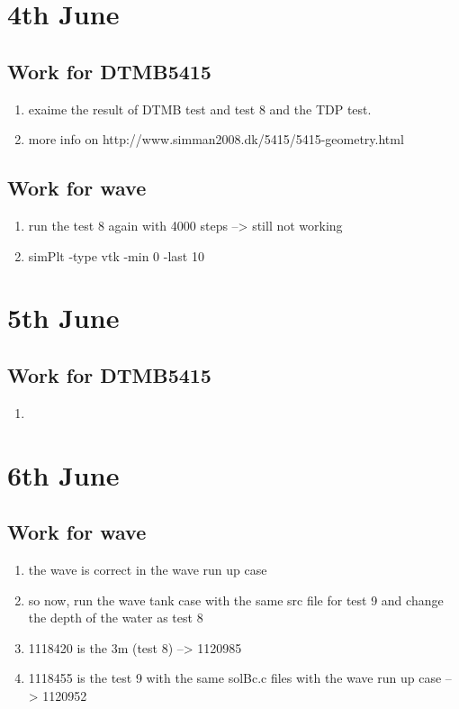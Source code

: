 \documentclass[12pt]{article} %
\begin{document}
\section{4th June}
\subsection{Work for DTMB5415}
\begin{enumerate}
    \item exaime the result of DTMB test and test 8 and the TDP test.
    \item more info on http://www.simman2008.dk/5415/5415-geometry.html
\end{enumerate}
\subsection{Work for wave}
\begin{enumerate}
    \item run the test 8 again with 4000 steps --> still not working 
    \item simPlt -type vtk -min 0 -last 10
\end{enumerate}
\section{5th June}
\subsection{Work for DTMB5415}
\begin{enumerate}
    \item 
\end{enumerate}
\section{6th June}
\subsection{Work for wave}
\begin{enumerate}
    \item the wave is correct in the wave run up case
    \item so now, run the wave tank case with the same src file for test 9 and change the depth of the water as test 8
    \item 1118420 is the 3m  (test 8) --> 1120985
    \item 1118455 is the test 9 with the same solBc.c files with the wave run up case --> 1120952
\end{enumerate}
\end{document}
